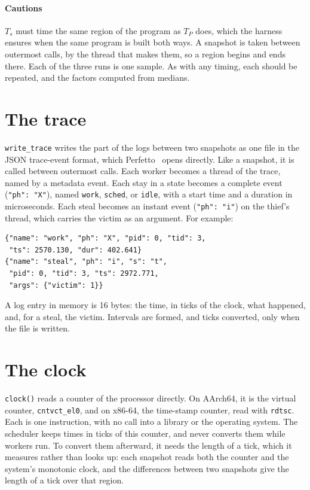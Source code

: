 \documentclass[sigplan,nonacm]{acmart}
\begin{document}
\paragraph{Cautions}
%
$T_s$ must time the same region of the program as $T_P$ does, which
the harness ensures when the same program is built both ways.
%
A snapshot is taken between outermost calls, by the thread that makes
them, so a region begins and ends there.
%
Each of the three runs is one sample.
%
As with any timing, each should be repeated, and the factors computed
from medians.

\section{The trace}
\label{sec:trace}

\lstinline|write_trace| writes the part of the logs between two
snapshots as one file in the JSON trace-event format, which
Perfetto~\cite{perfetto} opens directly.
%
Like a snapshot, it is called between outermost calls.
%
Each worker becomes a thread of the trace, named by a metadata event.
%
Each stay in a state becomes a complete event (\lstinline|"ph": "X"|),
named \lstinline|work|, \lstinline|sched|, or \lstinline|idle|, with a
start time and a duration in microseconds.
%
Each steal becomes an instant event (\lstinline|"ph": "i"|) on the
thief's thread, which carries the victim as an argument.
%
For example:
%
\begin{lstlisting}[language={},mathescape=false,basicstyle=\footnotesize\ttfamily]
{"name": "work", "ph": "X", "pid": 0, "tid": 3,
 "ts": 2570.130, "dur": 402.641}
{"name": "steal", "ph": "i", "s": "t",
 "pid": 0, "tid": 3, "ts": 2972.771,
 "args": {"victim": 1}}
\end{lstlisting}
%
A log entry in memory is 16 bytes: the time, in ticks of the clock,
what happened, and, for a steal, the victim.
%
Intervals are formed, and ticks converted, only when the file is
written.


\section{The clock}
\label{sec:clock}

\lstinline|clock()| reads a counter of the processor directly.
%
On AArch64, it is the virtual counter, \lstinline|cntvct_el0|, and on
x86-64, the time-stamp counter, read with \lstinline|rdtsc|.
%
Each is one instruction, with no call into a library or the operating
system.
%
The scheduler keeps times in ticks of this counter, and never converts
them while workers run.
%
To convert them afterward, it needs the length of a tick, which it
measures rather than looks up: each snapshot reads both the counter
and the system's monotonic clock, and the differences between two
snapshots give the length of a tick over that region.
\end{document}
